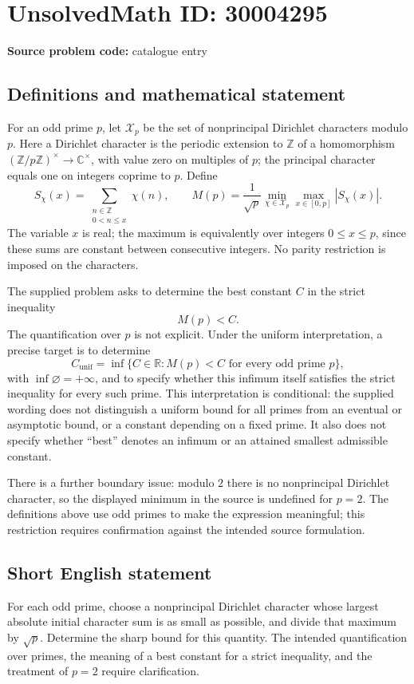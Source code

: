 \documentclass[11pt]{article}
\newcommand{\Z}{\mathbb{Z}}
\newcommand{\R}{\mathbb{R}}
\newcommand{\C}{\mathbb{C}}
\begin{document}
\section*{UnsolvedMath ID: 30004295}
\textbf{Source problem code:} catalogue entry
\subsection{Definitions and mathematical statement}
For an odd prime \(p\), let \(\mathcal X_p\) be the set of nonprincipal Dirichlet characters modulo \(p\). Here a Dirichlet character is the periodic extension to \(\Z\) of a homomorphism \((\Z/p\Z)^\times\to\C^\times\), with value zero on multiples of \(p\); the principal character equals one on integers coprime to \(p\). Define
\[
S_\chi(x)=\sum_{\substack{n\in\Z\\0<n\le x}}\chi(n),\qquad
M(p)=\frac{1}{\sqrt p}\min_{\chi\in\mathcal X_p}\max_{x\in[0,p]}|S_\chi(x)|.
\]
The variable \(x\) is real; the maximum is equivalently over integers \(0\le x\le p\), since these sums are constant between consecutive integers. No parity restriction is imposed on the characters.

The supplied problem asks to determine the best constant \(C\) in the strict inequality
\[
M(p)<C.
\]
The quantification over \(p\) is not explicit. Under the uniform interpretation, a precise target is to determine
\[
C_{\mathrm{unif}}=\inf\bigl\{C\in\R: M(p)<C\text{ for every odd prime }p\bigr\},
\]
with \(\inf\varnothing=+\infty\), and to specify whether this infimum itself satisfies the strict inequality for every such prime. This interpretation is conditional: the supplied wording does not distinguish a uniform bound for all primes from an eventual or asymptotic bound, or a constant depending on a fixed prime. It also does not specify whether ``best'' denotes an infimum or an attained smallest admissible constant.

There is a further boundary issue: modulo \(2\) there is no nonprincipal Dirichlet character, so the displayed minimum in the source is undefined for \(p=2\). The definitions above use odd primes to make the expression meaningful; this restriction requires confirmation against the intended source formulation.
\subsection{Short English statement}
For each odd prime, choose a nonprincipal Dirichlet character whose largest absolute initial character sum is as small as possible, and divide that maximum by \(\sqrt p\). Determine the sharp bound for this quantity. The intended quantification over primes, the meaning of a best constant for a strict inequality, and the treatment of \(p=2\) require clarification.
\end{document}
